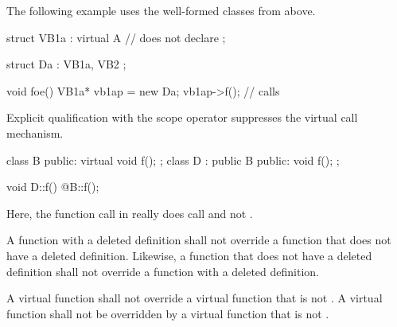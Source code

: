 \pnum
\begin{example}
The following example uses the well-formed classes from above.
\begin{codeblock}
struct VB1a : virtual A {       // does not declare 
};

struct Da : VB1a, VB2 {
};

void foe() {
  VB1a*  vb1ap = new Da;
  vb1ap->f();                   // calls 
}
\end{codeblock}
\end{example}

\pnum
{}%
%
Explicit qualification with the scope operator
suppresses the virtual call mechanism.
\begin{example}
\begin{codeblock}
class B { public: virtual void f(); };
class D : public B { public: void f(); };

void D::f() { @\commentellip@ B::f(); }
\end{codeblock}

Here, the function call in
really does call
and not
.
\end{example}

\pnum
A function with a deleted definition shall
not override a function that does not have a deleted definition. Likewise,
a function that does not have a deleted definition shall not override a
function with a deleted definition.%

\pnum
A  virtual function shall not override
a virtual function that is not .
A  virtual function shall not be overridden by
a virtual function that is not .

